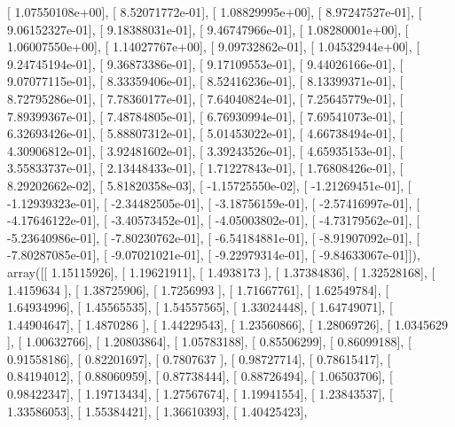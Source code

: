 \documentclass{article}
\begin{document}
       [  1.07550108e+00],
       [  8.52071772e-01],
       [  1.08829995e+00],
       [  8.97247527e-01],
       [  9.06152327e-01],
       [  9.18388031e-01],
       [  9.46747966e-01],
       [  1.08280001e+00],
       [  1.06007550e+00],
       [  1.14027767e+00],
       [  9.09732862e-01],
       [  1.04532944e+00],
       [  9.24745194e-01],
       [  9.36873386e-01],
       [  9.17109553e-01],
       [  9.44026166e-01],
       [  9.07077115e-01],
       [  8.33359406e-01],
       [  8.52416236e-01],
       [  8.13399371e-01],
       [  8.72795286e-01],
       [  7.78360177e-01],
       [  7.64040824e-01],
       [  7.25645779e-01],
       [  7.89399367e-01],
       [  7.48784805e-01],
       [  6.76930994e-01],
       [  7.69541073e-01],
       [  6.32693426e-01],
       [  5.88807312e-01],
       [  5.01453022e-01],
       [  4.66738494e-01],
       [  4.30906812e-01],
       [  3.92481602e-01],
       [  3.39243526e-01],
       [  4.65935153e-01],
       [  3.55833737e-01],
       [  2.13448433e-01],
       [  1.71227843e-01],
       [  1.76808426e-01],
       [  8.29202662e-02],
       [  5.81820358e-03],
       [ -1.15725550e-02],
       [ -1.21269451e-01],
       [ -1.12939323e-01],
       [ -2.34482505e-01],
       [ -3.18756159e-01],
       [ -2.57416997e-01],
       [ -4.17646122e-01],
       [ -3.40573452e-01],
       [ -4.05003802e-01],
       [ -4.73179562e-01],
       [ -5.23640986e-01],
       [ -7.80230762e-01],
       [ -6.54184881e-01],
       [ -8.91907092e-01],
       [ -7.80287085e-01],
       [ -9.07021021e-01],
       [ -9.22979314e-01],
       [ -9.84633067e-01]]), array([[ 1.15115926],
       [ 1.19621911],
       [ 1.4938173 ],
       [ 1.37384836],
       [ 1.32528168],
       [ 1.4159634 ],
       [ 1.38725906],
       [ 1.7256993 ],
       [ 1.71667761],
       [ 1.62549784],
       [ 1.64934996],
       [ 1.45565535],
       [ 1.54557565],
       [ 1.33024448],
       [ 1.64749071],
       [ 1.44904647],
       [ 1.4870286 ],
       [ 1.44229543],
       [ 1.23560866],
       [ 1.28069726],
       [ 1.0345629 ],
       [ 1.00632766],
       [ 1.20803864],
       [ 1.05783188],
       [ 0.85506299],
       [ 0.86099188],
       [ 0.91558186],
       [ 0.82201697],
       [ 0.7807637 ],
       [ 0.98727714],
       [ 0.78615417],
       [ 0.84194012],
       [ 0.88060959],
       [ 0.87738444],
       [ 0.88726494],
       [ 1.06503706],
       [ 0.98422347],
       [ 1.19713434],
       [ 1.27567674],
       [ 1.19941554],
       [ 1.23843537],
       [ 1.33586053],
       [ 1.55384421],
       [ 1.36610393],
       [ 1.40425423],
\end{document}
